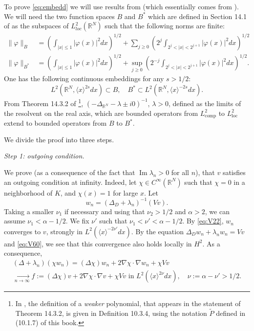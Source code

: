 \documentclass[10pt,leqno]{amsart}
\DeclareMathOperator{\im}{Im} %
\DeclareMathOperator{\comp}{comp}
\DeclareMathOperator{\loc}{loc}
\theoremstyle{definition}%
\theoremstyle{remark}
\numberwithin{equation}{section}
\newcommand{\R}{\mathbb{R}}
\renewcommand{\^}{\widehat}%
\begin{document}
To prove \eqref{eq:embedd} we will use results from \cite[Chapter 14]{Hormander.T2} (which essentially comes from \cite{Agmon75}). We will need the two function spaces $B$ and $B^*$ which are defined in Section 14.1 of \cite{Hormander.T2} as the subspaces of $L^2_{loc}(\R^N)$ such that the following norms are finite:
\begin{align}
\label{defB}
\|\varphi\|_{B}&=\left( \int_{|x|\leq 1}|\varphi(x)|^2dx \right)^{1/2}+\sum_{j\geq 0}\left( 2^j \int_{2^j<|x|<2^{j+1}} |\varphi(x)|^2dx\right)^{1/2}\\
\label{defB*}
\|\varphi\|_{B^*}&=\left( \int_{|x|\leq 1}|\varphi(x)|^2dx \right)^{1/2}+\sup_{j\geq 0}\left( 2^{-j} \int_{2^j<|x|<2^{j+1}} |\varphi(x)|^2dx\right)^{1/2}.
\end{align}
One has the following continuous embeddings for any $s>1/2$:
\begin{equation}
 \label{inclusion}
 L^2\left(\R^N,\langle x\rangle^{2s}dx\right)\subset B,\quad  B^*\subset L^2\left(\R^N,\langle x\rangle^{-2s}dx\right).
\end{equation} 
From Theorem 14.3.2 of \cite{Hormander.T2}\footnote{In \cite{Hormander.T2}, the definition of a \emph{weaker} polynomial, that appears in the statement of Theorem 14.3.2, is given in Definition 10.3.4, using the notation $\tilde{P}$ defined in (10.1.7) of this book.}, $(-\Delta_{\R^N}-\lambda\pm i0)^{-1}$, $\lambda>0$, defined as the limits of the resolvent on the real axis, which are bounded operators from $L^2_{\comp}$ to $L^2_{\loc}$ extend to bounded operators from $B$ to $B^*$.

We divide the proof into three steps.

\smallskip

\noindent\emph{Step 1: outgoing condition.}

 We prove (as a consequence of the fact that $\im\lambda_n>0$ for all $n$), that $v$ satisfies an outgoing condition at infinity.  Indeed, let $\chi \in C^{\infty}(\R^N)$ such that $\chi=0$ in a neighborhood of $K$, and $\chi(x)=1$ for large $x$. Let
\begin{equation}
\label{eq:w_n}
w_n =(\Delta_D+\lambda_n)^{-1}(Vv).
\end{equation}
Taking a smaller $\nu_1$ if necessary and using that $\nu_2>1/2$ and $\alpha>2$, we can assume $\nu_1<\alpha-1/2$.
We fix $\nu'$ such that $\nu_1<\nu'<\alpha-1/2$.
By \eqref{eq:V22}, $w_n$ converges to $v$, strongly in $L^2\left( \langle x\rangle^{-2\nu'} dx \right)$. By the equation $\Delta_D w_n+\lambda_n w_n=Vv$ and \eqref{eq:V60}, we see that this convergence also holds locally in $H^2$. As a consequence,
\begin{multline*}
(\Delta +\lambda_n)(\chi w_n)=(\Delta \chi)w_n+2\nabla \chi\cdot\nabla w_n+\chi V v\\
\underset{n\to\infty}{\longrightarrow} f:=(\Delta \chi)v+2\nabla \chi\cdot\nabla v+\chi Vv\text{ in }L^2\left( \langle x\rangle^{2\nu}dx \right),\quad \nu:=\alpha-\nu'>1/2.
\end{multline*}
\end{document}
